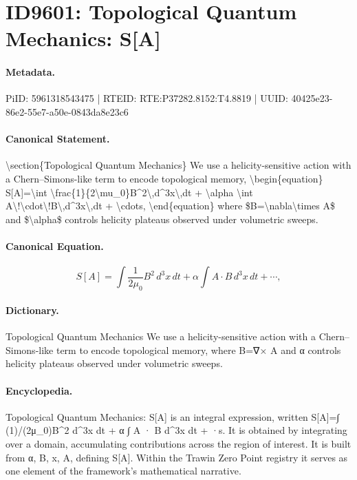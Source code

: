 \section*{ID9601: Topological Quantum Mechanics: S[A]}
\paragraph{Metadata.}
PiID: 5961318543475 | RTEID: RTE:P37282.8152:T4.8819 | UUID: 40425e23-86e2-55e7-a50e-0843da8e23c6

\paragraph{Canonical Statement.}
\textbackslash{}section\{Topological Quantum Mechanics\} We use a helicity-sensitive action with a Chern--Simons-like term to encode topological memory, \textbackslash{}begin\{equation\} S[A]=\textbackslash{}int \textbackslash{}frac\{1\}\{2\textbackslash{}mu\_0\}B\textasciicircum{}2\textbackslash{},d\textasciicircum{}3x\textbackslash{},dt + \textbackslash{}alpha \textbackslash{}int A\textbackslash{}!\textbackslash{}cdot\textbackslash{}!B\textbackslash{},d\textasciicircum{}3x\textbackslash{},dt + \textbackslash{}cdots, \textbackslash{}end\{equation\} where \$B=\textbackslash{}nabla\textbackslash{}times A\$ and \$\textbackslash{}alpha\$ controls helicity plateaus observed under volumetric sweeps.

\paragraph{Canonical Equation.}
\[
S[A]=\int \frac{1}{2\mu_0}B^2\,d^3x\,dt + \alpha \int A\!\cdot\!B\,d^3x\,dt + \cdots,
\]

\paragraph{Dictionary.}
Topological Quantum Mechanics We use a helicity-sensitive action with a Chern--Simons-like term to encode topological memory, where B=∇× A and α controls helicity plateaus observed under volumetric sweeps.

\paragraph{Encyclopedia.}
Topological Quantum Mechanics: S[A] is an integral expression, written S[A]=∫ (1)/(2μ\_0)B\textasciicircum{}2 d\textasciicircum{}3x dt + α ∫ A · B d\textasciicircum{}3x dt + ·s. It is obtained by integrating over a domain, accumulating contributions across the region of interest. It is built from α, B, x, A, defining S[A]. Within the Trawin Zero Point registry it serves as one element of the framework's mathematical narrative.

